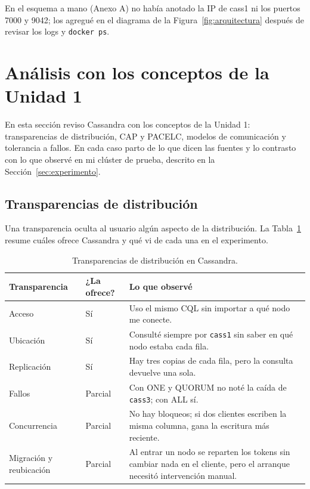 \documentclass[12pt,a4paper]{article}
\begin{document}
En el esquema a mano (Anexo A) no había anotado la IP de cass1 ni los puertos 7000 y 9042; los agregué en el diagrama de la Figura~\ref{fig:arquitectura} después de revisar los logs y \texttt{docker ps}.

\section{Análisis con los conceptos de la Unidad 1}
\label{sec:analisis}

En esta sección reviso Cassandra con los conceptos de la Unidad 1: transparencias de distribución, CAP y PACELC, modelos de comunicación y tolerancia a fallos. En cada caso parto de lo que dicen las fuentes y lo contrasto con lo que observé en mi clúster de prueba, descrito en la Sección~\ref{sec:experimento}.

\subsection{Transparencias de distribución}

Una transparencia oculta al usuario algún aspecto de la distribución. La Tabla~\ref{tab:transparencias} resume cuáles ofrece Cassandra y qué vi de cada una en el experimento.

\begin{table}[H]
  \centering
  \caption{Transparencias de distribución en Cassandra.}
  \label{tab:transparencias}
  \begin{tabularx}{\textwidth}{llX}
    \toprule
    Transparencia & ¿La ofrece? & Lo que observé \\
    \midrule
    Acceso       & Sí      & Uso el mismo CQL sin importar a qué nodo me conecte. \\
    Ubicación    & Sí      & Consulté siempre por \texttt{cass1} sin saber en qué nodo estaba cada fila. \\
    Replicación  & Sí      & Hay tres copias de cada fila, pero la consulta devuelve una sola. \\
    Fallos       & Parcial & Con ONE y QUORUM no noté la caída de \texttt{cass3}; con ALL sí. \\
    Concurrencia & Parcial & No hay bloqueos; si dos clientes escriben la misma columna, gana la escritura más reciente. \\
    Migración y reubicación & Parcial & Al entrar un nodo se reparten los tokens sin cambiar nada en el cliente, pero el arranque necesitó intervención manual. \\
    \bottomrule
  \end{tabularx}
\end{table}
\end{document}
